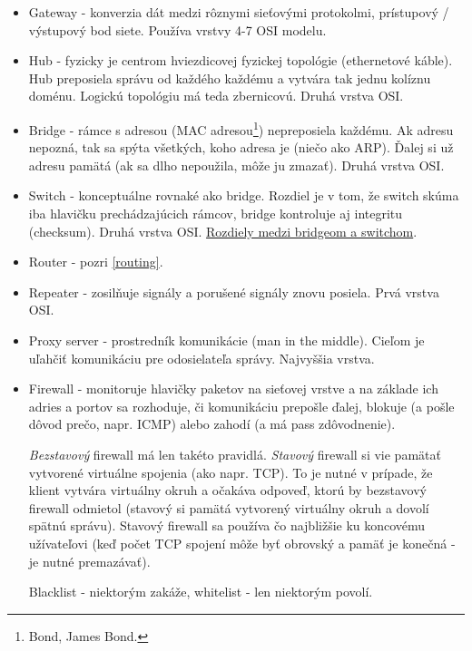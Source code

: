 \documentclass[10pt,a4paper]{article}
\begin{document}
\begin{itemize}
\item Gateway - konverzia dát medzi rôznymi sieťovými protokolmi, prístupový / výstupový bod siete. Používa vrstvy 4-7 OSI modelu. 
\item Hub - fyzicky je centrom hviezdicovej fyzickej topológie (ethernetové káble). Hub preposiela správu od každého každému a vytvára tak jednu kolíznu doménu. Logickú topológiu má teda zbernicovú. Druhá vrstva OSI. 
\item Bridge - rámce s adresou (MAC adresou\footnote{
Bond, James Bond. 
}) nepreposiela každému. Ak adresu nepozná, tak sa spýta všetkých, koho adresa je (niečo ako ARP). Ďalej si už adresu pamätá (ak sa dlho nepoužila, môže ju zmazať). Druhá vrstva OSI. 
\item Switch - konceptuálne rovnaké ako bridge. Rozdiel je v tom, že switch skúma iba hlavičku prechádzajúcich rámcov, bridge kontroluje aj integritu (checksum). Druhá vrstva OSI. \href{http://en.wikipedia.org/wiki/Ethernet#Bridging_and_switching}{Rozdiely medzi bridgeom a switchom}. 
\item Router - pozri \ref{routing}. 
\item Repeater - zosilňuje signály a porušené signály znovu posiela. Prvá vrstva OSI. 
\item Proxy server - prostredník komunikácie (man in the middle). Cieľom je uľahčiť komunikáciu pre odosielateľa správy. Najvyššia vrstva.  
\label{firewall} 
\item Firewall - monitoruje hlavičky paketov na sieťovej vrstve a na základe ich adries a portov sa rozhoduje, či komunikáciu prepošle ďalej, blokuje (a pošle dôvod prečo, napr. ICMP) alebo zahodí (a má pass zdôvodnenie). 

\emph{Bezstavový} firewall má len takéto pravidlá. \emph{Stavový} firewall si vie pamätať vytvorené virtuálne spojenia (ako napr. TCP). To je nutné v prípade, že klient vytvára virtuálny okruh a očakáva odpoveď, ktorú by bezstavový firewall odmietol (stavový si pamätá vytvorený virtuálny okruh a dovolí spätnú správu). Stavový firewall sa používa čo najbližšie ku koncovému užívateľovi (keď počet TCP spojení môže byť obrovský a pamäť je konečná - je nutné premazávať). 

Blacklist - niektorým zakáže, whitelist - len niektorým povolí. 


\end{itemize}
\end{document}
